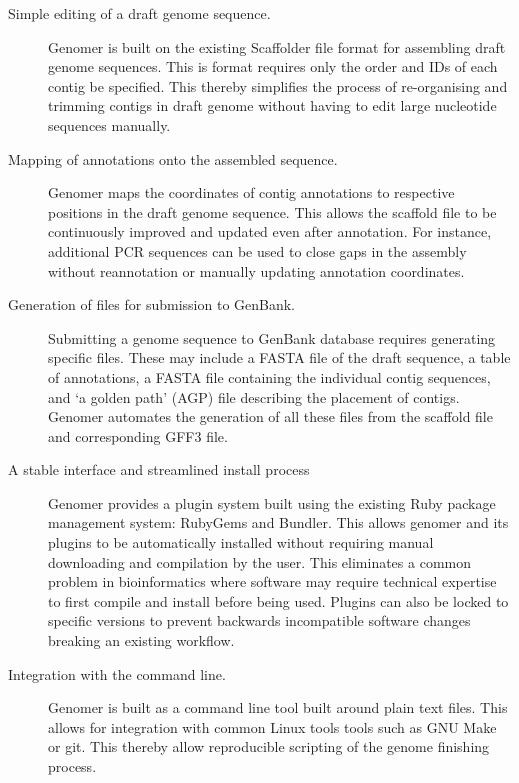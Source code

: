 \documentclass[10pt]{article}
\begin{document}
\begin{description} 

  \item[Simple editing of a draft genome sequence.]{Genomer is built on the
  existing Scaffolder \cite{barton2012} file format for assembling draft genome
  sequences. This is format requires only the order and IDs of each contig be
  specified. This thereby simplifies the process of re-organising and trimming
  contigs in draft genome without having to edit large nucleotide sequences
  manually.}

  \item[Mapping of annotations onto the assembled sequence.]{Genomer maps the
  coordinates of contig annotations to respective positions in the draft genome
  sequence. This allows the scaffold file to be continuously improved and
  updated even after annotation. For instance, additional PCR sequences can be
  used to close gaps in the assembly without reannotation or manually updating
  annotation coordinates.}

  \item[Generation of files for submission to GenBank.]{Submitting a genome
  sequence to GenBank database requires generating specific files. These may
  include a FASTA file of the draft sequence, a table of annotations, a FASTA
  file containing the individual contig sequences, and `a golden path' (AGP)
  \cite{agp-spec} file describing the placement of contigs. Genomer automates
  the generation of all these files from the scaffold file and corresponding
  GFF3 file.}

  \item[A stable interface and streamlined install process]{Genomer provides a
  plugin system built using the existing Ruby package management system:
  RubyGems and Bundler. This allows genomer and its plugins to be automatically
  installed without requiring manual downloading and compilation by the user.
  This eliminates a common problem in bioinformatics where software may require
  technical expertise to first compile and install before being used. Plugins
  can also be locked to specific versions to prevent backwards incompatible
  software changes breaking an existing workflow.}

  \item[Integration with the command line.]{Genomer is built as a command line
  tool built around plain text files. This allows for integration with common
  Linux tools tools such as GNU Make or git. This thereby allow reproducible
  scripting of the genome finishing process.}

\end{description}
\end{document}
